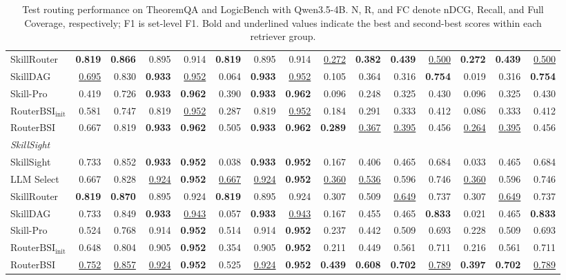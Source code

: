 \begin{table}[t]
\begin{tabular*}{\textwidth}{@{\extracolsep{\fill}}lrrrrrrrrrrrrrr@{}}
SkillRouter & \textbf{0.819} & \textbf{0.866} & 0.895 & 0.914 & \textbf{0.819} & 0.895 & 0.914 & \underline{0.272} & \textbf{0.382} & \textbf{0.439} & \underline{0.500} & \textbf{0.272} & \textbf{0.439} & \underline{0.500} \\
SkillDAG & \underline{0.695} & 0.830 & \textbf{0.933} & \underline{0.952} & 0.064 & \textbf{0.933} & \underline{0.952} & 0.105 & 0.364 & 0.316 & \textbf{0.754} & 0.019 & 0.316 & \textbf{0.754} \\
Skill-Pro & 0.419 & 0.726 & \textbf{0.933} & \textbf{0.962} & 0.390 & \textbf{0.933} & \textbf{0.962} & 0.096 & 0.248 & 0.325 & 0.430 & 0.096 & 0.325 & 0.430 \\
$\mathrm{RouterBSI}_{\mathrm{init}}$ & 0.581 & 0.747 & 0.819 & \underline{0.952} & 0.287 & 0.819 & \underline{0.952} & 0.184 & 0.291 & 0.333 & 0.412 & 0.086 & 0.333 & 0.412 \\
RouterBSI & 0.667 & 0.819 & \textbf{0.933} & \textbf{0.962} & 0.505 & \textbf{0.933} & \textbf{0.962} & \textbf{0.289} & \underline{0.367} & \underline{0.395} & 0.456 & \underline{0.264} & \underline{0.395} & 0.456 \\
\midrule
\multicolumn{15}{l}{\textit{SkillSight}} \\
\midrule
SkillSight & 0.733 & 0.852 & \textbf{0.933} & \textbf{0.952} & 0.038 & \textbf{0.933} & \textbf{0.952} & 0.167 & 0.406 & 0.465 & 0.684 & 0.033 & 0.465 & 0.684 \\
LLM Select & 0.667 & 0.828 & \underline{0.924} & \textbf{0.952} & \underline{0.667} & \underline{0.924} & \textbf{0.952} & \underline{0.360} & \underline{0.536} & 0.596 & 0.746 & \underline{0.360} & 0.596 & 0.746 \\
SkillRouter & \textbf{0.819} & \textbf{0.870} & 0.895 & 0.924 & \textbf{0.819} & 0.895 & 0.924 & 0.307 & 0.509 & \underline{0.649} & 0.737 & 0.307 & \underline{0.649} & 0.737 \\
SkillDAG & 0.733 & 0.849 & \textbf{0.933} & \underline{0.943} & 0.057 & \textbf{0.933} & \underline{0.943} & 0.167 & 0.455 & 0.465 & \textbf{0.833} & 0.021 & 0.465 & \textbf{0.833} \\
Skill-Pro & 0.524 & 0.768 & 0.914 & \textbf{0.952} & 0.514 & 0.914 & \textbf{0.952} & 0.237 & 0.442 & 0.509 & 0.693 & 0.228 & 0.509 & 0.693 \\
$\mathrm{RouterBSI}_{\mathrm{init}}$ & 0.648 & 0.804 & 0.905 & \textbf{0.952} & 0.354 & 0.905 & \textbf{0.952} & 0.211 & 0.449 & 0.561 & 0.711 & 0.216 & 0.561 & 0.711 \\
RouterBSI & \underline{0.752} & \underline{0.857} & \underline{0.924} & \textbf{0.952} & 0.525 & \underline{0.924} & \textbf{0.952} & \textbf{0.439} & \textbf{0.608} & \textbf{0.702} & \underline{0.789} & \textbf{0.397} & \textbf{0.702} & \underline{0.789} \\
\bottomrule
\end{tabular*}
\caption{Test routing performance on TheoremQA and LogicBench with Qwen3.5-4B. N, R, and FC denote nDCG, Recall, and Full Coverage, respectively; F1 is set-level F1. Bold and underlined values indicate the best and second-best scores within each retriever group.}
\label{tab:app-routing-1}
\end{table}
